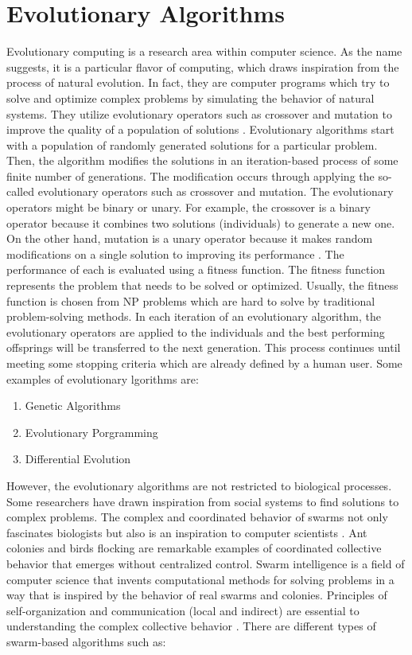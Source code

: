 \section{Evolutionary Algorithms}
Evolutionary computing is a research area within computer science. As the name suggests, it is a particular flavor of computing, which draws inspiration from the process of natural evolution. In fact, they are computer programs which try to solve and optimize complex problems by simulating the behavior of natural systems. They utilize evolutionary operators such as crossover and mutation to improve the quality of a population of solutions \cite{burke2005search}. \newline
Evolutionary algorithms start with a population of randomly generated solutions for a particular problem. Then, the algorithm modifies the solutions in an iteration-based process of some finite number of generations. The modification occurs through applying the so-called evolutionary operators such as crossover and mutation. The evolutionary operators might be binary or unary. For example, the crossover is a binary operator because it combines two solutions (individuals) to generate a new one. On the other hand, mutation is a unary operator because it makes random modifications on a single solution to improving its performance \cite{eiben2003introduction}. The performance of each is evaluated using a fitness function. The fitness function represents the problem that needs to be solved or optimized. Usually, the fitness function is chosen from NP problems which are hard to solve by traditional problem-solving methods. In each iteration of an evolutionary algorithm, the evolutionary operators are applied to the individuals and the best performing offsprings will be transferred to the next generation. This process continues until meeting some stopping criteria which are already defined by a human user. Some examples of evolutionary lgorithms are:
\begin{enumerate}
	\item Genetic Algorithms
	\item Evolutionary Porgramming
	\item Differential Evolution
\end{enumerate}
However, the evolutionary algorithms are not restricted to biological processes. Some researchers have drawn inspiration from social systems to find solutions to complex problems. The complex and coordinated behavior of swarms not only fascinates biologists but also is an inspiration to computer scientists \cite{bonabeau1999swarm}. Ant colonies and birds flocking are remarkable examples of coordinated collective behavior that emerges without centralized control. Swarm intelligence is a field of computer science that invents computational methods for solving problems in a way that is inspired by the behavior of real swarms and colonies. Principles of self-organization and communication (local and indirect) are essential to understanding the complex collective behavior \cite{stutzle2009ant}. There are different types of swarm-based algorithms such as:
